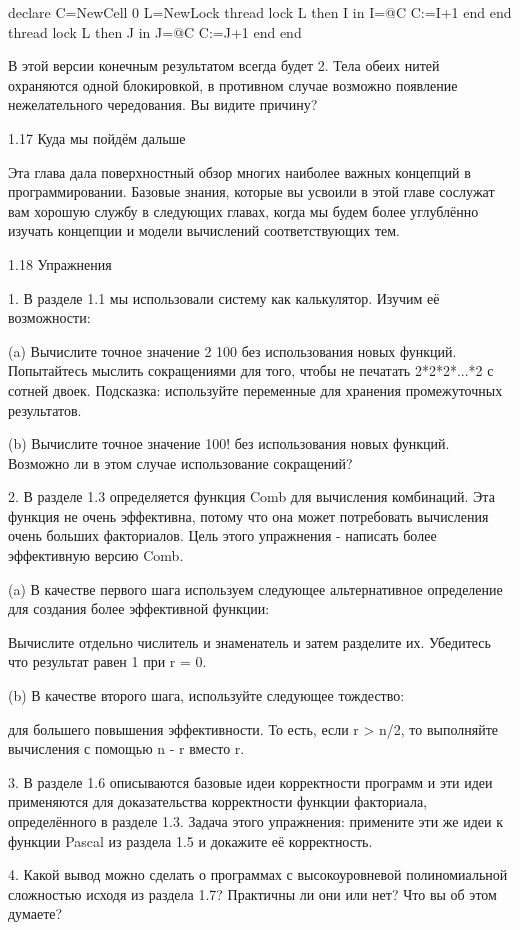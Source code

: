 declare
C={NewCell 0}
L={NewLock}
thread
lock L then I in
I=@C
C:=I+1
end
end
thread
lock L then J in
J=@C
C:=J+1
end
end

В этой версии конечным результатом всегда будет 2. Тела обеих нитей охраняются одной блокировкой, в противном случае возможно появление нежелательного чередования. Вы видите причину?

1.17 Куда мы пойдём дальше

Эта глава дала поверхностный обзор многих наиболее важных концепций в программировании. Базовые знания, которые вы усвоили в этой главе сослужат вам хорошую службу в следующих главах, когда мы будем более углублённо изучать концепции и модели вычислений соответствующих тем.

1.18 Упражнения

1. В разделе 1.1 мы использовали систему как калькулятор. Изучим её возможности:

(a) Вычислите точное значение 2 100 без использования новых функций. Попытайтесь мыслить сокращениями для того, чтобы не печатать 2*2*2*...*2 с сотней двоек. Подсказка: используйте переменные для хранения промежуточных результатов.

(b) Вычислите точное значение 100! без использования новых функций. Возможно ли в этом случае использование сокращений?

2. В разделе 1.3 определяется функция Comb для вычисления комбинаций. Эта функция не очень эффективна, потому что она может потребовать вычисления очень больших факториалов. Цель этого упражнения - написать более эффективную версию Comb.

(a) В качестве первого шага используем следующее альтернативное определение для создания более эффективной функции:

Вычислите отдельно числитель и знаменатель и затем разделите их. Убедитесь что результат равен 1 при r = 0.

(b) В качестве второго шага, используйте следующее тождество:

для большего повышения эффективности. То есть, если r > n/2, то выполняйте вычисления с помощью n - r вместо r.

3. В разделе 1.6 описываются базовые идеи корректности программ и эти идеи применяются для доказательства корректности функции факториала, определённого в разделе 1.3. Задача этого упражнения: примените эти же идеи к функции Pascal из раздела 1.5 и докажите её корректность.

4. Какой вывод можно сделать о программах с высокоуровневой полиномиальной сложностью исходя из раздела 1.7? Практичны ли они или нет? Что вы об этом думаете?

